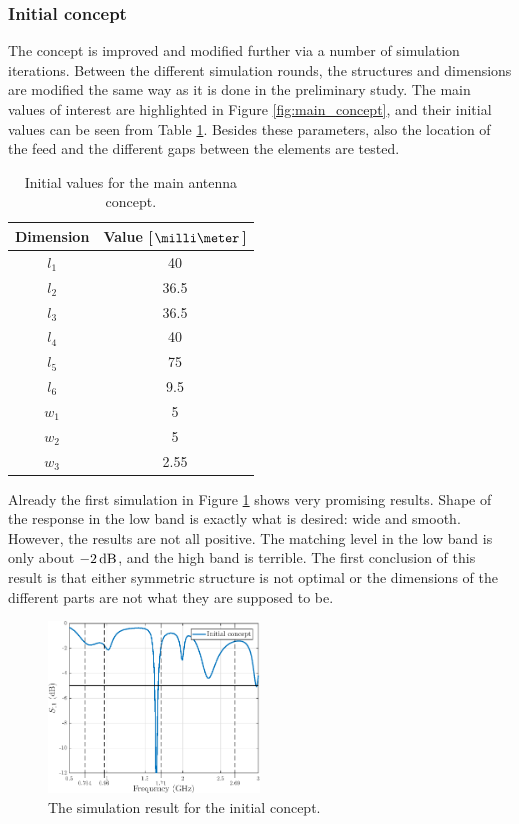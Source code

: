 \subsubsection{Initial concept}
\label{sec:initial_concept}
The concept is improved and modified further via a number of simulation iterations. Between the different simulation rounds, the structures and dimensions are modified the same way as it is done in the preliminary study. The main values of interest are highlighted in Figure \ref{fig:main_concept}, and their initial values can be seen from Table \ref{tab:initial_concept}. Besides these parameters, also the location of the feed and the different gaps between the elements are tested. 
\begin{table}[H]
    \centering
    \caption{Initial values for the main antenna concept.}
    \label{tab:initial_concept}
    \begin{tabular}{|c|c|}
        \hline
        \textbf{Dimension} & \textbf{Value [$\milli\meter$]} \\
        \hline
        $l_1$ & 40\\
        \hline
        $l_2$ & 36.5\\
        \hline
        $l_3$ & 36.5\\
        \hline
        $l_4$ & 40\\
        \hline
        $l_5$ & 75\\
        \hline
        $l_6$ & 9.5\\
        \hline
        $w_1$ & 5\\
        \hline
        $w_2$ & 5\\
        \hline
        $w_3$ & 2.55\\
        \hline
    \end{tabular}
\end{table}

Already the first simulation in Figure \ref{fig:concept_ini} shows very promising results. Shape of the response in the low band is exactly what is desired: wide and smooth. However, the results are not all positive. The matching level in the low band is only about $-2\,\mathrm{dB}$, and the high band is terrible. The first conclusion of this result is that either symmetric structure is not optimal or the dimensions of the different parts are not what they are supposed to be.
\begin{figure}[H]
    \centering
    \includegraphics[width=0.5\textwidth]{img/concept_ini.eps}
    \caption{The simulation result for the initial concept.}
    \label{fig:concept_ini}
\end{figure}


